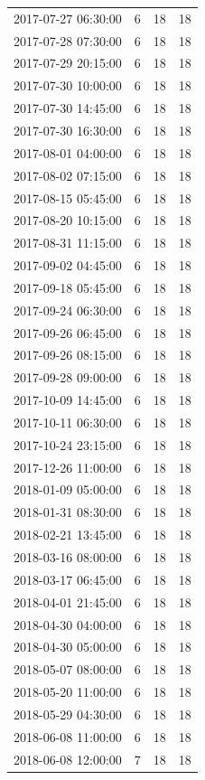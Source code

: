 \begin{tabular}{lrrr}
2017-07-27 06:30:00 & 6 & 18 & 18 \\
2017-07-28 07:30:00 & 6 & 18 & 18 \\
2017-07-29 20:15:00 & 6 & 18 & 18 \\
2017-07-30 10:00:00 & 6 & 18 & 18 \\
2017-07-30 14:45:00 & 6 & 18 & 18 \\
2017-07-30 16:30:00 & 6 & 18 & 18 \\
2017-08-01 04:00:00 & 6 & 18 & 18 \\
2017-08-02 07:15:00 & 6 & 18 & 18 \\
2017-08-15 05:45:00 & 6 & 18 & 18 \\
2017-08-20 10:15:00 & 6 & 18 & 18 \\
2017-08-31 11:15:00 & 6 & 18 & 18 \\
2017-09-02 04:45:00 & 6 & 18 & 18 \\
2017-09-18 05:45:00 & 6 & 18 & 18 \\
2017-09-24 06:30:00 & 6 & 18 & 18 \\
2017-09-26 06:45:00 & 6 & 18 & 18 \\
2017-09-26 08:15:00 & 6 & 18 & 18 \\
2017-09-28 09:00:00 & 6 & 18 & 18 \\
2017-10-09 14:45:00 & 6 & 18 & 18 \\
2017-10-11 06:30:00 & 6 & 18 & 18 \\
2017-10-24 23:15:00 & 6 & 18 & 18 \\
2017-12-26 11:00:00 & 6 & 18 & 18 \\
2018-01-09 05:00:00 & 6 & 18 & 18 \\
2018-01-31 08:30:00 & 6 & 18 & 18 \\
2018-02-21 13:45:00 & 6 & 18 & 18 \\
2018-03-16 08:00:00 & 6 & 18 & 18 \\
2018-03-17 06:45:00 & 6 & 18 & 18 \\
2018-04-01 21:45:00 & 6 & 18 & 18 \\
2018-04-30 04:00:00 & 6 & 18 & 18 \\
2018-04-30 05:00:00 & 6 & 18 & 18 \\
2018-05-07 08:00:00 & 6 & 18 & 18 \\
2018-05-20 11:00:00 & 6 & 18 & 18 \\
2018-05-29 04:30:00 & 6 & 18 & 18 \\
2018-06-08 11:00:00 & 6 & 18 & 18 \\
2018-06-08 12:00:00 & 7 & 18 & 18 \\

\end{tabular}
